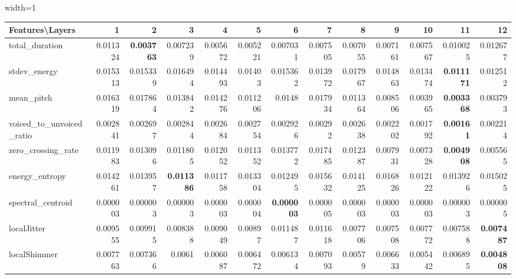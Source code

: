 \documentclass[sigconf]{acmart}
\newcommand{\mj}{Mockingjay\xspace}
\begin{document}
\begin{table*}[]
\begin{adjustbox}{width=1\textwidth}
\begin{tabular}{@{}l|rrrrrrrrrrrr@{}}
\toprule
\textbf{Features\textbackslash{}Layers} & 1 & 2 & 3 & 4 & 5 & 6 & 7 & 8 & 9 & 10 & 11 & 12 \\ \midrule
total\_duration & 0.011324 & \textbf{0.003763} & 0.007239 & 0.005672 & 0.005221 & 0.007031 & 0.007505 & 0.007055 & 0.007161 & 0.007567 & 0.010025 & 0.012677 \\
stdev\_energy & 0.015313 & 0.015339 & 0.016494 & 0.014493 & 0.01403 & 0.015362 & 0.013972 & 0.017967 & 0.014863 & 0.013474 & \textbf{0.011171} & 0.012512 \\
mean\_pitch & 0.016319 & 0.017864 & 0.013842 & 0.014276 & 0.011206 & 0.0148 & 0.017934 & 0.011364 & 0.008506 & 0.003965 & \textbf{0.003368} & 0.003793 \\
voiced\_to\_unvoiced\_ratio & 0.002841 & 0.002697 & 0.002844 & 0.002684 & 0.002754 & 0.002926 & 0.00292 & 0.002638 & 0.002202 & 0.001792 & \textbf{0.00161} & 0.002214 \\
zero\_crossing\_rate & 0.011983 & 0.013096 & 0.011805 & 0.012052 & 0.011352 & 0.013772 & 0.017485 & 0.012387 & 0.007931 & 0.007328 & \textbf{0.004908} & 0.005565 \\
energy\_entropy & 0.014261 & 0.013957 & \textbf{0.011386} & 0.011758 & 0.013304 & 0.012495 & 0.015632 & 0.014125 & 0.016826 & 0.012122 & 0.013926 & 0.015025 \\
spectral\_centroid & 0.000003 & 0.000003 & 0.000003 & 0.000003 & 0.000004 & \textbf{0.000003} & 0.000005 & 0.000003 & 0.000003 & 0.000003 & 0.000003 & 0.000005 \\
localJitter & 0.009555 & 0.009915 & 0.008388 & 0.009049 & 0.00897 & 0.011487 & 0.011618 & 0.007706 & 0.007508 & 0.007772 & 0.007588 & \textbf{0.007487} \\
localShimmer & 0.007763 & 0.007366 & 0.0061 & 0.006087 & 0.006472 & 0.006134 & 0.007093 & 0.00579 & 0.006633 & 0.005442 & 0.006895 & \textbf{0.004808}\\ \bottomrule
\end{tabular}
\end{adjustbox}
\vspace{1 mm}
\caption{\label{nAudio_M} \small  Results (MSE) for audio features on {\mj} for non-native read speech corpus (L2 Arctic)}

\end{table*}
\end{document}
